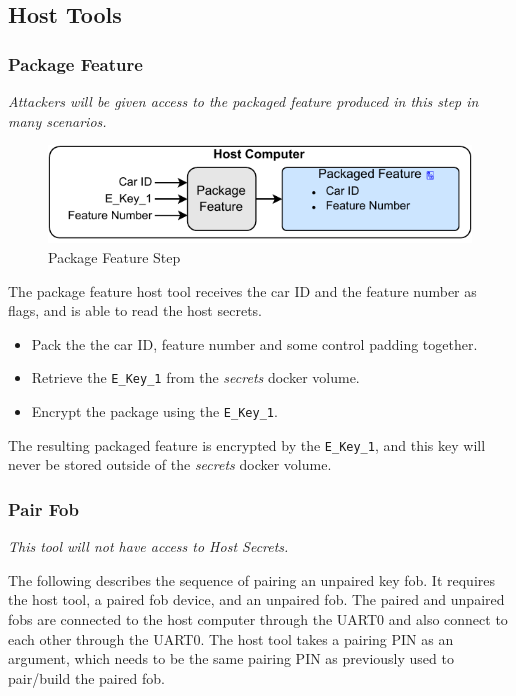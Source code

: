 \documentclass[11pt,oneside,onecolumn,letterpaper]{article}
\begin{document}
\subsection{Host Tools}

\subsubsection{Package Feature}

\textit{Attackers will be given access to the packaged feature produced in this step in many scenarios.}

\begin{figure}[!htbp]
	\begin{centering}
		\includegraphics[width = .6\textwidth]{pic/package_feature.pdf}
		\caption{Package Feature Step}
		\label{fig:package_feature}
	\end{centering}
\end{figure}

The package feature host tool receives the car ID and the feature number as flags, and is able to read the host secrets.
\begin{itemize}
	\item Pack the the car ID, feature number and some control padding together.
	\item Retrieve the \verb|E_Key_1| from the \textit{secrets} docker volume.
	\item Encrypt the package using the \verb|E_Key_1|.
\end{itemize}

The resulting packaged feature is encrypted by the \verb|E_Key_1|, and this key will never be stored outside of the \textit{secrets} docker volume.

\subsubsection{Pair Fob}

\textit{This tool will not have access to Host Secrets.}

The following describes the sequence of pairing an unpaired key fob. It requires the host tool, a paired fob device, and an unpaired fob. The paired and unpaired fobs are connected to the host computer through the UART0 and also connect to each other through the UART0. The host tool takes a pairing PIN as an argument, which needs to be the same pairing PIN as previously used to pair/build the paired fob.
\end{document}
